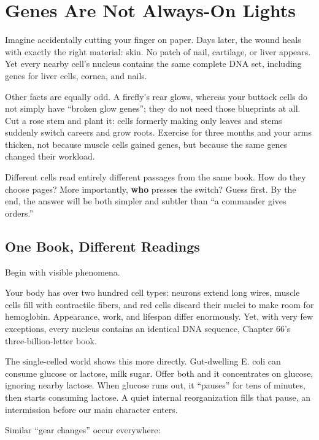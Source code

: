 \chapter{Genes Are Not Always-On Lights}

\begin{kaichang}
Imagine accidentally cutting your finger on paper. Days later, the wound heals with exactly the right material: skin. No patch of nail, cartilage, or liver appears. Yet every nearby cell's nucleus contains the same complete DNA set, including genes for liver cells, cornea, and nails.

Other facts are equally odd. A firefly's rear glows, whereas your buttock cells do not simply have ``broken glow genes''; they do not need those blueprints at all. Cut a rose stem and plant it: cells formerly making only leaves and stems suddenly switch careers and grow roots. Exercise for three months and your arms thicken, not because muscle cells gained genes, but because the same genes changed their workload.

Different cells read entirely different passages from the same book. How do they choose pages? More importantly, \textbf{who} presses the switch? Guess first. By the end, the answer will be both simpler and subtler than ``a commander gives orders.''
\end{kaichang}

\section{One Book, Different Readings}

Begin with visible phenomena.

Your body has over two hundred cell types: neurons extend long wires, muscle cells fill with contractile fibers, and red cells discard their nuclei to make room for hemoglobin. Appearance, work, and lifespan differ enormously. Yet, with very few exceptions, every nucleus contains an identical DNA sequence, Chapter 66's three-billion-letter book.

The single-celled world shows this more directly. Gut-dwelling E. coli can consume glucose or lactose, milk sugar. Offer both and it concentrates on glucose, ignoring nearby lactose. When glucose runs out, it ``pauses'' for tens of minutes, then starts consuming lactose. A quiet internal reorganization fills that pause, an intermission before our main character enters.

Similar ``gear changes'' occur everywhere:

